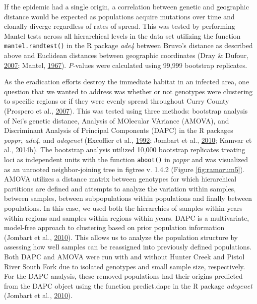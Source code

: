 \documentclass[double,11pt]{beavtex}
\begin{document}
  If the epidemic had a single origin, a correlation between genetic and
  geographic distance would be expected as populations acquire mutations
  over time and clonally diverge regardless of rates of spread. This was
  tested by performing Mantel tests across all hierarchical levels in the
  data set utilizing the function \texttt{mantel.randtest()} in the R
  package \emph{ade4} between Bruvo's distance as described above and
  Euclidean distances between geographic coordinates (Dray \& Dufour,
  \protect\hyperlink{ref-dray2007ade4}{2007}; Mantel,
  \protect\hyperlink{ref-mantel1967detection}{1967}). \emph{P}-values were
  calculated using 99,999 bootstrap replicates.
  
  As the eradication efforts destroy the immediate habitat in an infected
  area, one question that we wanted to address was whether or not
  genotypes were clustering to specific regions or if they were evenly
  spread throughout Curry County (Prospero et al.,
  \protect\hyperlink{ref-prospero2007population}{2007}). This was tested
  using three methods: bootstrap analysis of Nei's genetic distance,
  Analysis of MOlecular VAriance (AMOVA), and Discriminant Analysis of
  Principal Components (DAPC) in the R packages \emph{poppr}, \emph{ade4},
  and \emph{adegenet} (Excoffier et al.,
  \protect\hyperlink{ref-excoffier1992analysis}{1992}; Jombart et al.,
  \protect\hyperlink{ref-jombart2010discriminant}{2010}; Kamvar et al.,
  \protect\hyperlink{ref-kamvar2014poppr}{2014}\protect\hyperlink{ref-kamvar2014poppr}{b}).
  The bootstrap analysis utilized 10,000 bootstrap replicates treating
  loci as independent units with the function \texttt{aboot()} in
  \emph{poppr} and was visualized as an unrooted neighbor-joining tree in
  figtree v. 1.4.2 (Figure \ref{fig:ramorum5}). AMOVA utilizes a distance
  matrix between genotypes for which hierarchical partitions are defined
  and attempts to analyze the variation within samples, between samples,
  between subpopulations within populations and finally between
  populations. In this case, we used both the hierarchies of samples
  within years within regions and samples within regions within years.
  DAPC is a multivariate, model-free approach to clustering based on prior
  population information (Jombart et al.,
  \protect\hyperlink{ref-jombart2010discriminant}{2010}). This allows us
  to analyze the population structure by assessing how well samples can be
  reassigned into previously defined populations. Both DAPC and AMOVA were
  run with and without Hunter Creek and Pistol River South Fork due to
  isolated genotypes and small sample size, respectively. For the DAPC
  analysis, these removed populations had their origins predicted from the
  DAPC object using the function predict.dapc in the R package
  \emph{adegenet} (Jombart et al.,
  \protect\hyperlink{ref-jombart2010discriminant}{2010}).
  
\end{document}
